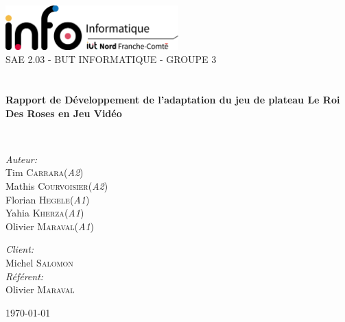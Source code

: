 \begin{titlepage}
\begin{center}

\includegraphics[width=0.5\textwidth]{./images/InfoLogoQuadriH.png}~\\[1cm]

\textsc{\LARGE SAE 2.03 - BUT INFORMATIQUE - GROUPE 3}\\[1.5cm]

\textsc{\Large }\\[0.5cm]

\HRule \\[0.4cm]

{\huge \bfseries Rapport de Développement 
    de l'adaptation du jeu de plateau Le Roi Des Roses en
    Jeu Vidéo\\[0.4cm] }

\HRule \\[1.5cm]

\begin{minipage}{0.4\textwidth}
    \begin{flushleft} \large
        \emph{Auteur:}\\
        Tim \textsc{Carrara}(\textit{A2})\\
        Mathis \textsc{Courvoisier}(\textit{A2})\\
        Florian \textsc{Hegele}(\textit{A1})\\
        Yahia \textsc{Kherza}(\textit{A1})\\
        Olivier \textsc{Maraval}(\textit{A1})\\
    \end{flushleft}
\end{minipage}
\begin{minipage}{0.4\textwidth}
    \begin{flushright} \large
        \emph{Client:} \\
        Michel \textsc{Salomon}\\
        \emph{Référent:} \\
        Olivier \textsc{Maraval}
    \end{flushright}
\end{minipage}

\vfill

{\large \today}

\end{center}
\end{titlepage}
